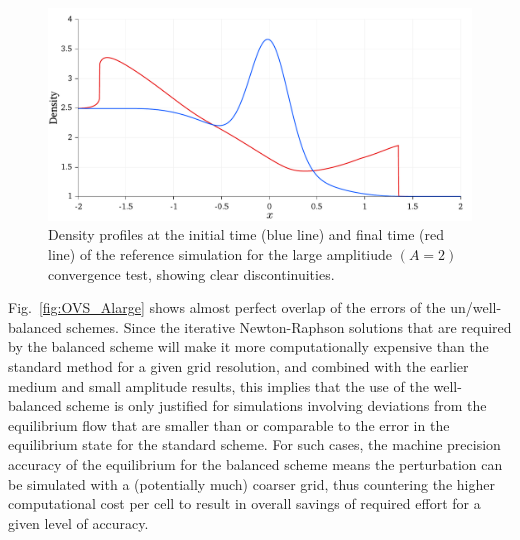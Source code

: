 \begin {figure}
\centering
\includegraphics[width=13cm]{figures/OVSeps2profile}
\caption {Density profiles at the initial time (blue line) and final time (red line) of the reference simulation for the large amplitiude $(A=2)$ convergence test, showing clear discontinuities.}
\label{fig:OVS_Alarge_profile}
\end{figure}

Fig.~\ref{fig:OVS_Alarge} shows almost perfect overlap of the errors of the un/well-balanced schemes. Since the iterative Newton-Raphson solutions that are required by the balanced scheme will make it more computationally expensive than the standard method for a given grid resolution, and combined with the earlier medium and small amplitude results, this implies that the use of the well-balanced scheme is only justified for simulations involving deviations from the equilibrium flow that are smaller than or comparable to the error in the equilibrium state for the standard scheme. For such cases, the machine precision accuracy of the equilibrium for the balanced scheme means the perturbation can be simulated with a (potentially much) coarser grid, thus countering the higher computational cost per cell to result in overall savings of required effort for a given level of accuracy.

